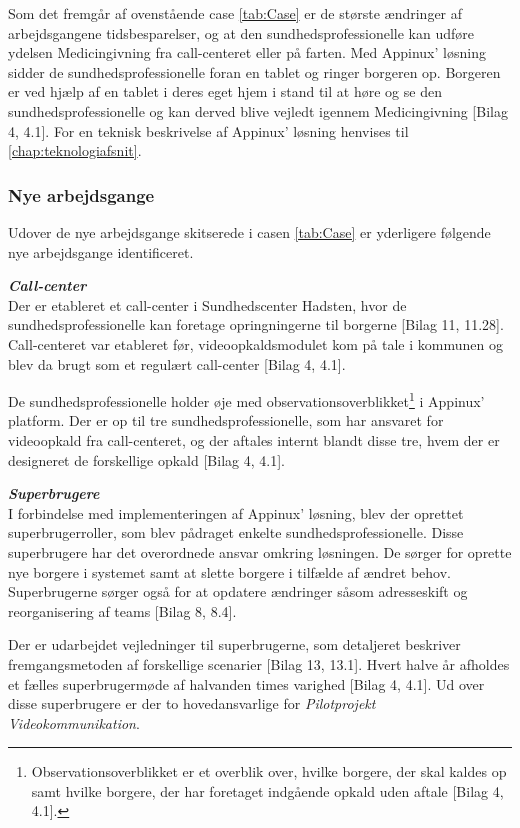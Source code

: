 Som det fremgår af ovenstående case \ref{tab:Case} er de største ændringer af arbejdsgangene tidsbesparelser, og at den sundhedsprofessionelle kan udføre ydelsen Medicingivning fra call-centeret eller på farten. Med Appinux' løsning sidder de sundhedsprofessionelle foran en tablet og ringer borgeren op. Borgeren er ved hjælp af en tablet i deres eget hjem i stand til at høre og se den sundhedsprofessionelle og kan derved blive vejledt igennem Medicingivning [Bilag 4, 4.1]. For en teknisk beskrivelse af Appinux' løsning henvises til \vref{chap:teknologiafsnit}.


\subsubsection{Nye arbejdsgange}
Udover de nye arbejdsgange skitserede i casen \ref{tab:Case} er yderligere følgende nye arbejdsgange identificeret. 

\textit{\textbf{Call-center}}\\
Der er etableret et call-center i Sundhedscenter Hadsten, hvor de sundhedsprofessionelle kan foretage opringningerne til borgerne [Bilag 11, 11.28]. Call-centeret var etableret før, videoopkaldsmodulet kom på tale i kommunen og blev da brugt som et regulært call-center [Bilag 4, 4.1].

De sundhedsprofessionelle holder øje med observationsoverblikket\footnote{Observationsoverblikket er et overblik over, hvilke borgere, der skal kaldes op samt hvilke borgere, der har foretaget indgående opkald uden aftale [Bilag 4, 4.1].} i Appinux' platform. Der er op til tre sundhedsprofessionelle, som har ansvaret for videoopkald fra call-centeret, og der aftales internt blandt disse tre, hvem der er designeret de forskellige opkald [Bilag 4, 4.1].

\textit{\textbf{Superbrugere}}\\ 
I forbindelse med implementeringen af Appinux' løsning, blev der oprettet superbrugerroller, som blev pådraget enkelte sundhedsprofessionelle. Disse superbrugere har det overordnede ansvar omkring løsningen. De sørger for oprette nye borgere i systemet samt at slette borgere i tilfælde af ændret behov. Superbrugerne sørger også for at opdatere ændringer såsom adresseskift og reorganisering af teams [Bilag 8, 8.4].

Der er udarbejdet vejledninger til superbrugerne, som detaljeret beskriver fremgangsmetoden af forskellige scenarier [Bilag 13, 13.1]. Hvert halve år afholdes et fælles superbrugermøde af halvanden times varighed [Bilag 4, 4.1]. Ud over disse superbrugere er der to hovedansvarlige for \textit{Pilotprojekt Videokommunikation}.

